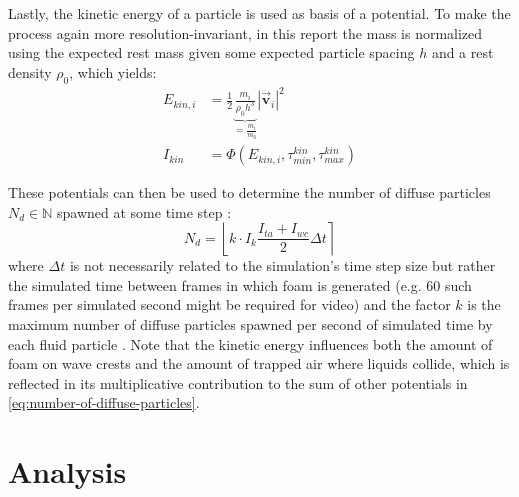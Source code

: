 \documentclass[oneside, a4paper]{book}
\newcommand\abs[1]{\left|#1\right|}
\newcommand\round[1]{\left\lfloor#1\right\rceil}
\newcommand\vek[1]{\vec{\bm{#1}}}
\begin{document}
  Lastly, the kinetic energy of a particle is used as basis of a potential. To make the process again more resolution-invariant, in this report the mass is normalized using the expected rest mass given some expected particle spacing $h$ and a rest density $\rho_0$, which yields:
  \begin{align}
    E_{kin,i} &= \frac{1}{2} \underbrace{\frac{m_i}{\rho_0 h^3}}_{=\frac{m_i}{m_0}} \abs{\vek{v}_i}^2\\
    I_{kin} &= \Phi(E_{kin,i},\tau_{min}^{kin}, \tau_{max}^{kin})
  \end{align}

  These potentials can then be used to determine the number of diffuse particles $N_d\in\mathds{N}$ spawned at some time step \autocite{turbulent-micropolar-foam}:
  \begin{equation}\label{eq:number-of-diffuse-particles}
    N_d = \round{k \cdot I_k \frac{I_{ta}+I_{wc}}{2} \Delta t}
  \end{equation}
  where $\Delta t$ is not necessarily related to the simulation's time step size but rather the simulated time between frames in which foam is generated (e.g. $60$ such frames per simulated second might be required for video) and the factor $k$ is the maximum number of diffuse particles spawned per second of simulated time by each fluid particle \autocite{turbulent-micropolar-foam}. Note that the kinetic energy influences both the amount of foam on wave crests and the amount of trapped air where liquids collide, which is reflected in its multiplicative contribution to the sum of other potentials in \autoref{eq:number-of-diffuse-particles}.



\chapter{Analysis}\label{chp:analysis}
\end{document}
